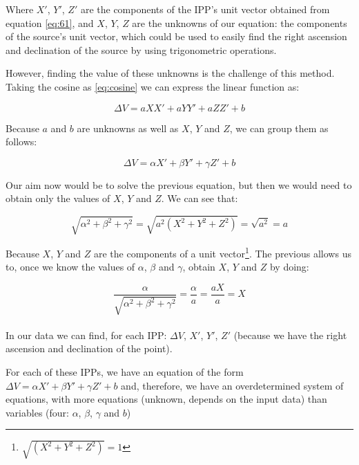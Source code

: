 Where $X'$, $Y'$, $Z'$ are the components of the IPP's unit vector obtained from equation \ref{eq:61}, and $X$, $Y$, $Z$ are the unknowns of our equation: the components of the source's unit vector, which could be used to easily find the right ascension and declination of the source by using trigonometric operations.

However, finding the value of these unknowns is the challenge of this method. Taking the cosine as \ref{eq:cosine} we can express the linear function as:

\begin{equation} \label{eq:substitute}
\Delta V = aXX' + aYY' + aZZ' + b
\end{equation}

Because $a$ and $b$ are unknowns as well as $X$, $Y$ and $Z$, we can group them as follows:

\begin{equation} \label{eq:newNames}
\Delta V = \alpha X' +  \beta Y' +  \gamma Z' + b
\end{equation}

Our aim now would be to solve the previous equation, but then we would need to obtain only the values of $X$, $Y$ and $Z$. We can see that:

\begin{equation} \label{eq:elTrucoDelAlmendruco}
\sqrt{\alpha^{2}+\beta^{2}+\gamma^{2}} = \sqrt{a^{2}(X^{2}+Y^{2}+Z^{2})} = \sqrt{a^{2}} = a
\end{equation}

Because $X$, $Y$ and $Z$ are the components of a unit vector\footnote{$\sqrt{(X^{2}+Y^{2}+Z^{2})} = 1$}. The previous allows us to, once we know the values of $\alpha$, $\beta$ and $\gamma$, obtain $X$, $Y$ and $Z$ by doing:

\begin{equation} \label{eq:iso}
\frac{\alpha}{\sqrt{\alpha^{2}+\beta^{2}+\gamma^{2}}} = \frac{\alpha}{a} = \frac{aX}{a} = X
\end{equation} \\

In our data we can find, for each IPP: $\Delta V$, $X'$, $Y'$, $Z'$ (because we have the right ascension and declination of the point).

For each of these IPPs, we have an equation of the form $\Delta V = \alpha X' +  \beta Y' +  \gamma Z' + b$ and, therefore, we have an overdetermined system of equations, with more equations (unknown, depends on the input data) than variables (four: $\alpha$, $\beta$, $\gamma$ and $b$)

